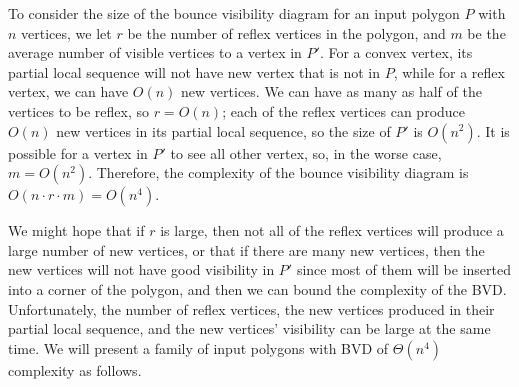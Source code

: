 \documentclass[]{article}  %
\begin{document}
To consider the size of the bounce visibility diagram for an input polygon $P$ with $n$ vertices, we let $r$ be the number of reflex vertices in the polygon, and $m$ be the average number of visible vertices to a vertex in $P'$. For a convex vertex, its partial local sequence will not have new vertex that is not in $P$, while for a reflex vertex, we can have $O(n)$ new vertices. We can have as many as half of the vertices to be reflex, so $r = O(n)$; each of the reflex vertices can produce $O(n)$ new vertices in its partial local sequence, so the size of $P'$ is $O(n^2)$. It is possible for a vertex in $P'$ to see all other vertex, so, in the worse case, $m = O(n^2)$. Therefore, the complexity of the bounce visibility diagram is $O(n\cdot r\cdot m) = O(n^4)$. 

We might hope that if $r$ is large, then not all of the reflex vertices will produce a large number of new vertices, or that if there are many new vertices, then the new vertices will not have good visibility in $P'$ since most of them will be inserted into a corner of the polygon, and then we can bound the complexity of the BVD. Unfortunately, the number of reflex vertices, the new vertices produced in their partial local sequence, and the new vertices' visibility can be large at the same time. We will present a family of input polygons with BVD of $\Theta(n^4)$ complexity as follows. 
\end{document}
